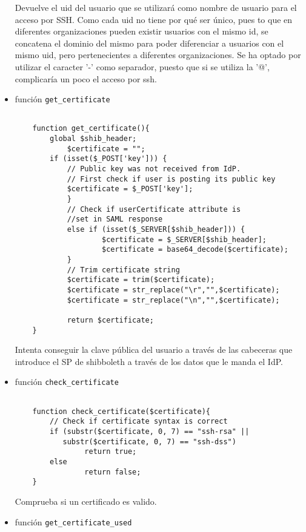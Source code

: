 \begin{itemize}
    Devuelve el uid del usuario que se utilizará como nombre de usuario
    para el acceso por SSH. Como cada uid no tiene por qué ser único, pues
    to que en diferentes organizaciones pueden existir usuarios con el
    mismo id, se concatena el dominio del mismo para poder diferenciar a
    usuarios con el mismo uid, pero pertenecientes a diferentes
    organizaciones. Se ha optado por utilizar el caracter '-' como
    separador, puesto que si se utiliza la '@', complicaría un poco el
    acceso por ssh.

    \item función \texttt{get\_certificate}
    \begin{lstlisting}
    
    function get_certificate(){
        global $shib_header;
            $certificate = "";
        if (isset($_POST['key'])) {
            // Public key was not received from IdP.
            // First check if user is posting its public key
            $certificate = $_POST['key'];
            }
            // Check if userCertificate attribute is 
            //set in SAML response
            else if (isset($_SERVER[$shib_header])) {
                    $certificate = $_SERVER[$shib_header];
                    $certificate = base64_decode($certificate);
            }
            // Trim certificate string
            $certificate = trim($certificate);
            $certificate = str_replace("\r","",$certificate);
            $certificate = str_replace("\n","",$certificate);

            return $certificate;
    }
    \end{lstlisting}

    Intenta conseguir la clave pública del usuario a través de las
    cabeceras que introduce el SP de shibboleth a través de los datos que
    le manda el IdP.

    \item función \texttt{check\_certificate}
    \begin{lstlisting}

    function check_certificate($certificate){
        // Check if certificate syntax is correct
        if (substr($certificate, 0, 7) == "ssh-rsa" ||
           substr($certificate, 0, 7) == "ssh-dss")
                return true;
        else
                return false;
    }
    \end{lstlisting}

    Comprueba si un certificado es valido.

    \item función \texttt{get\_certificate\_used}
    \begin{lstlisting}


\end{lstlisting}
\end{itemize}
